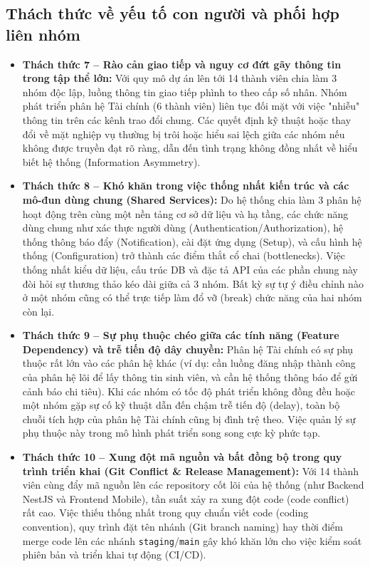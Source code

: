 \subsection{Thách thức về yếu tố con người và phối hợp liên nhóm}
\begin{itemize}
    \item \textbf{Thách thức 7 -- Rào cản giao tiếp và nguy cơ đứt gãy thông tin trong tập thể lớn:} 
    Với quy mô dự án lên tới 14 thành viên chia làm 3 nhóm độc lập, luồng thông tin giao tiếp phình to theo cấp số nhân. Nhóm phát triển phân hệ Tài chính (6 thành viên) liên tục đối mặt với việc "nhiễu" thông tin trên các kênh trao đổi chung. Các quyết định kỹ thuật hoặc thay đổi về mặt nghiệp vụ thường bị trôi hoặc hiểu sai lệch giữa các nhóm nếu không được truyền đạt rõ ràng, dẫn đến tình trạng không đồng nhất về hiểu biết hệ thống (Information Asymmetry).
    
    \item \textbf{Thách thức 8 -- Khó khăn trong việc thống nhất kiến trúc và các mô-đun dùng chung (Shared Services):} 
    Do hệ thống chia làm 3 phân hệ hoạt động trên cùng một nền tảng cơ sở dữ liệu và hạ tầng, các chức năng dùng chung như xác thực người dùng (Authentication/Authorization), hệ thống thông báo đẩy (Notification), cài đặt ứng dụng (Setup), và cấu hình hệ thống (Configuration) trở thành các điểm thắt cổ chai (bottlenecks). Việc thống nhất kiểu dữ liệu, cấu trúc DB và đặc tả API của các phần chung này đòi hỏi sự thương thảo kéo dài giữa cả 3 nhóm. Bất kỳ sự tự ý điều chỉnh nào ở một nhóm cũng có thể trực tiếp làm đổ vỡ (break) chức năng của hai nhóm còn lại.
    
    \item \textbf{Thách thức 9 -- Sự phụ thuộc chéo giữa các tính năng (Feature Dependency) và trễ tiến độ dây chuyền:} 
    Phân hệ Tài chính có sự phụ thuộc rất lớn vào các phân hệ khác (ví dụ: cần luồng đăng nhập thành công của phân hệ lõi để lấy thông tin sinh viên, và cần hệ thống thông báo để gửi cảnh báo chi tiêu). Khi các nhóm có tốc độ phát triển không đồng đều hoặc một nhóm gặp sự cố kỹ thuật dẫn đến chậm trễ tiến độ (delay), toàn bộ chuỗi tích hợp của phân hệ Tài chính cũng bị đình trệ theo. Việc quản lý sự phụ thuộc này trong mô hình phát triển song song cực kỳ phức tạp.
    
    \item \textbf{Thách thức 10 -- Xung đột mã nguồn và bất đồng bộ trong quy trình triển khai (Git Conflict \& Release Management):} 
    Với 14 thành viên cùng đẩy mã nguồn lên các repository cốt lõi của hệ thống (như Backend NestJS và Frontend Mobile), tần suất xảy ra xung đột code (code conflict) rất cao. Việc thiếu thống nhất trong quy chuẩn viết code (coding convention), quy trình đặt tên nhánh (Git branch naming) hay thời điểm merge code lên các nhánh \texttt{staging}/\texttt{main} gây khó khăn lớn cho việc kiểm soát phiên bản và triển khai tự động (CI/CD).


\end{itemize}
